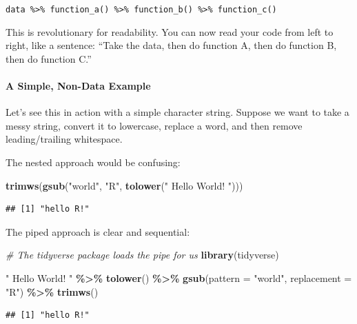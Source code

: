 \documentclass[
  11pt,
]{article}
\newenvironment{Shaded}{\begin{snugshade}}{\end{snugshade}}
\newcommand{\AttributeTok}[1]{\textcolor[rgb]{0.13,0.29,0.53}{#1}}
\newcommand{\CommentTok}[1]{\textcolor[rgb]{0.56,0.35,0.01}{\textit{#1}}}
\newcommand{\FunctionTok}[1]{\textcolor[rgb]{0.13,0.29,0.53}{\textbf{#1}}}
\newcommand{\NormalTok}[1]{#1}
\newcommand{\SpecialCharTok}[1]{\textcolor[rgb]{0.81,0.36,0.00}{\textbf{#1}}}
\newcommand{\StringTok}[1]{\textcolor[rgb]{0.31,0.60,0.02}{#1}}
\begin{document}
\texttt{data\ \%\textgreater{}\%\ function\_a()\ \%\textgreater{}\%\ function\_b()\ \%\textgreater{}\%\ function\_c()}

This is revolutionary for readability. You can now read your code from
left to right, like a sentence: ``Take the data, then do function A,
then do function B, then do function C.''

\paragraph{A Simple, Non-Data Example}\label{a-simple-non-data-example}

Let's see this in action with a simple character string. Suppose we want
to take a messy string, convert it to lowercase, replace a word, and
then remove leading/trailing whitespace.

The nested approach would be confusing:

\begin{Shaded}
\begin{Highlighting}[]
\FunctionTok{trimws}\NormalTok{(}\FunctionTok{gsub}\NormalTok{(}\StringTok{"world"}\NormalTok{, }\StringTok{"R"}\NormalTok{, }\FunctionTok{tolower}\NormalTok{(}\StringTok{"  Hello World!  "}\NormalTok{)))}
\end{Highlighting}
\end{Shaded}

\begin{verbatim}
## [1] "hello R!"
\end{verbatim}

The piped approach is clear and sequential:

\begin{Shaded}
\begin{Highlighting}[]
\CommentTok{\# The tidyverse package loads the pipe for us}
\FunctionTok{library}\NormalTok{(tidyverse)}

\StringTok{"  Hello World!  "} \SpecialCharTok{\%\textgreater{}\%}
  \FunctionTok{tolower}\NormalTok{() }\SpecialCharTok{\%\textgreater{}\%}
  \FunctionTok{gsub}\NormalTok{(}\AttributeTok{pattern =} \StringTok{"world"}\NormalTok{, }\AttributeTok{replacement =} \StringTok{"R"}\NormalTok{) }\SpecialCharTok{\%\textgreater{}\%}
  \FunctionTok{trimws}\NormalTok{()}
\end{Highlighting}
\end{Shaded}

\begin{verbatim}
## [1] "hello R!"
\end{verbatim}
\end{document}
